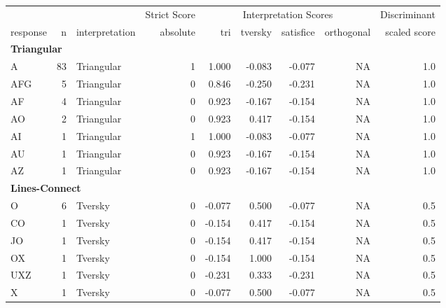 \documentclass[
  letterpaper,
  DIV=11,
  numbers=noendperiod]{scrreprt}
\begin{document}
\begin{tabular}[t]{l|r|l|r|r|r|r|r|r}
\hline
\multicolumn{3}{c|}{ } & \multicolumn{1}{c|}{Strict Score} & \multicolumn{4}{c|}{Interpretation Scores} & \multicolumn{1}{c}{Discriminant} \\
\cline{4-4} \cline{5-8} \cline{9-9}
response & n & interpretation & absolute & tri & tversky & satisfice & orthogonal & scaled score\\
\hline
\multicolumn{9}{l}{\textbf{Triangular}}\\
\hline
\hspace{1em}A & 83 & Triangular & 1 & 1.000 & -0.083 & -0.077 & NA & 1.0\\
\hline
\hspace{1em}AFG & 5 & Triangular & 0 & 0.846 & -0.250 & -0.231 & NA & 1.0\\
\hline
\hspace{1em}AF & 4 & Triangular & 0 & 0.923 & -0.167 & -0.154 & NA & 1.0\\
\hline
\hspace{1em}AO & 2 & Triangular & 0 & 0.923 & 0.417 & -0.154 & NA & 1.0\\
\hline
\hspace{1em}AI & 1 & Triangular & 1 & 1.000 & -0.083 & -0.077 & NA & 1.0\\
\hline
\hspace{1em}AU & 1 & Triangular & 0 & 0.923 & -0.167 & -0.154 & NA & 1.0\\
\hline
\hspace{1em}AZ & 1 & Triangular & 0 & 0.923 & -0.167 & -0.154 & NA & 1.0\\
\hline
\multicolumn{9}{l}{\textbf{Lines-Connect}}\\
\hline
\hspace{1em}O & 6 & Tversky & 0 & -0.077 & 0.500 & -0.077 & NA & 0.5\\
\hline
\hspace{1em}CO & 1 & Tversky & 0 & -0.154 & 0.417 & -0.154 & NA & 0.5\\
\hline
\hspace{1em}JO & 1 & Tversky & 0 & -0.154 & 0.417 & -0.154 & NA & 0.5\\
\hline
\hspace{1em}OX & 1 & Tversky & 0 & -0.154 & 1.000 & -0.154 & NA & 0.5\\
\hline
\hspace{1em}UXZ & 1 & Tversky & 0 & -0.231 & 0.333 & -0.231 & NA & 0.5\\
\hline
\hspace{1em}X & 1 & Tversky & 0 & -0.077 & 0.500 & -0.077 & NA & 0.5\\

\end{tabular}
\end{document}

